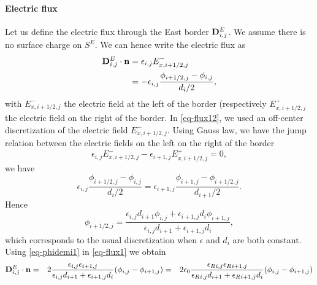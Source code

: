     \paragraph*{Electric flux \\}
    Let us define the electric flux through the East border  ${\mathbf D}^E_{i,j}$.
    We assume there is no surface charge on $S^E$.
    We can hence write the electric flux as
    \begin{align} \label{eq-flux1}
      {\mathbf D}^E_{i,j} \cdot {\mathbf n} &= \epsilon_{i,j} E_{x, i+1/2,j}^-\\
                                      &= - \epsilon_{i,j} \frac{\phi_{i+1/2,j} - \phi_{i,j}}{d_i/2}, \label{eq-flux12}
    \end{align}
    with $E_{x, i+1/2,j}^-$ the electric field at the left of the border (respectively $E_{x, i+1/2,j}^+$ the electric field on the right of the border.
    In \cref{eq-flux12}, we used an off-center discretization of the electric field $E_{x, i+1/2,j}^-$.
    Using Gauss law, we have the jump relation between the electric fields on the left on the right of the border
    \begin{equation} \label{eq-gausslaw}
      \epsilon_{i,j}E_{x, i+1/2,j}^- - \epsilon_{i+1,j}E_{x, i+1/2,j}^+ =0,
    \end{equation}
    we have
    \begin{equation}
      \epsilon_{i,j} \frac{\phi_{i+1/2,j} - \phi_{i,j}}{d_i/2} = \epsilon_{i+1,j} \frac{\phi_{i+1,j} - \phi_{i+1/2,j}}{d_{i+1}/2}.
    \end{equation}
    Hence
    \begin{equation} \label{eq-phidemi1}
      \phi_{i+1/2,j} = \frac{\epsilon_{i,j} d_{i+1} \phi_{i,j} + \epsilon_{i+1,j} d_{i} \phi_{i+1,j} }{\epsilon_{i,j} d_{i+1} + \epsilon_{i+1,j} d_{i} },
    \end{equation}
    which corresponds to the usual discretization \citep{croes2017} when $\epsilon$ and $d_i$ are both constant.
    Using \cref{eq-phidemi1} in \cref{eq-flux1} we obtain
    \begin{align}
      \label{eq-nosc}
    {\mathbf D}^E_{i,j} \cdot {\mathbf n} &=& 2\frac{\epsilon_{i,j}\epsilon_{i+1,j}}{\epsilon_{i,j}d_{i+1} + \epsilon_{i+1,j} d_i} (\phi_{i,j}-\phi_{i+1,j})
    &=& 2\epsilon_0 \frac{\epsilon_{R}{}_{i,j}\epsilon_{R}{}_{i+1,j}}{\epsilon_{R}{}_{i,j}d_{i+1} + \epsilon_{R}{}_{i+1,j} d_i} (\phi_{i,j}-\phi_{i+1,j})
    \end{align}


